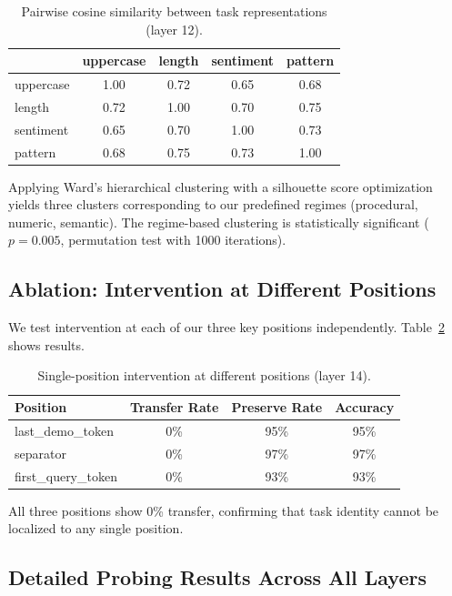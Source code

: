 \documentclass[sigconf,anonymous]{acmart}
\begin{document}
\begin{table}[h]
\centering
\small
\caption{Pairwise cosine similarity between task representations (layer 12).}
\label{tab:similarity}
\begin{tabular}{@{}lcccc@{}}
\toprule
& uppercase & length & sentiment & pattern \\
\midrule
uppercase & 1.00 & 0.72 & 0.65 & 0.68 \\
length & 0.72 & 1.00 & 0.70 & 0.75 \\
sentiment & 0.65 & 0.70 & 1.00 & 0.73 \\
pattern & 0.68 & 0.75 & 0.73 & 1.00 \\
\bottomrule
\end{tabular}
\end{table}

Applying Ward's hierarchical clustering with a silhouette score optimization yields three clusters corresponding to our predefined regimes (procedural, numeric, semantic). The regime-based clustering is statistically significant ($p = 0.005$, permutation test with 1000 iterations).

\subsection{Ablation: Intervention at Different Positions}

We test intervention at each of our three key positions independently. Table~\ref{tab:position_ablation} shows results.

\begin{table}[h]
\centering
\small
\caption{Single-position intervention at different positions (layer 14).}
\label{tab:position_ablation}
\begin{tabular}{@{}lccc@{}}
\toprule
Position & Transfer Rate & Preserve Rate & Accuracy \\
\midrule
last\_demo\_token & 0\% & 95\% & 95\% \\
separator & 0\% & 97\% & 97\% \\
first\_query\_token & 0\% & 93\% & 93\% \\
\bottomrule
\end{tabular}
\end{table}

All three positions show 0\% transfer, confirming that task identity cannot be localized to any single position.

\subsection{Detailed Probing Results Across All Layers}
\end{document}
